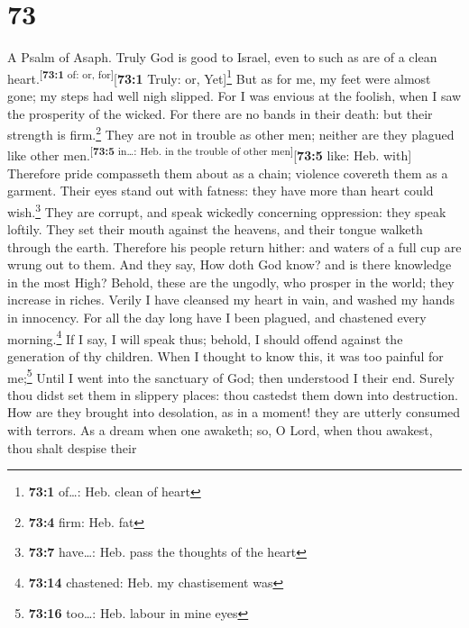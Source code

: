 \hypertarget{section-72}{%
\section{73}\label{section-72}}

A Psalm of Asaph.  Truly God is good to Israel, even to
such as are of a clean heart.\textsuperscript{{[}\textbf{73:1} of: or,
for{]}}{[}\textbf{73:1} Truly: or, Yet{]}\footnote{\textbf{73:1}
  of\ldots: Heb. clean of heart}  But as for me, my feet
were almost gone; my steps had well nigh slipped.  For I
was envious at the foolish, when I saw the prosperity of the wicked.
 For there are no bands in their death: but their strength
is firm.\footnote{\textbf{73:4} firm: Heb. fat}  They are
not in trouble as other men; neither are they plagued like other
men.\textsuperscript{{[}\textbf{73:5} in\ldots: Heb. in the trouble of
other men{]}}{[}\textbf{73:5} like: Heb. with{]} 
Therefore pride compasseth them about as a chain; violence covereth them
as a garment.  Their eyes stand out with fatness: they
have more than heart could wish.\footnote{\textbf{73:7} have\ldots: Heb.
  pass the thoughts of the heart}  They are corrupt, and
speak wickedly concerning oppression: they speak loftily. 
They set their mouth against the heavens, and their tongue walketh
through the earth.  Therefore his people return hither:
and waters of a full cup are wrung out to them.  And they
say, How doth God know? and is there knowledge in the most High?
 Behold, these are the ungodly, who prosper in the world;
they increase in riches.  Verily I have cleansed my heart
in vain, and washed my hands in innocency.  For all the
day long have I been plagued, and chastened every morning.\footnote{\textbf{73:14}
  chastened: Heb. my chastisement was}  If I say, I will
speak thus; behold, I should offend against the generation of thy
children.  When I thought to know this, it was too
painful for me;\footnote{\textbf{73:16} too\ldots: Heb. labour in mine
  eyes}  Until I went into the sanctuary of God; then
understood I their end.  Surely thou didst set them in
slippery places: thou castedst them down into destruction.
 How are they brought into desolation, as in a moment!
they are utterly consumed with terrors.  As a dream when
one awaketh; so, O Lord, when thou awakest, thou shalt despise their
